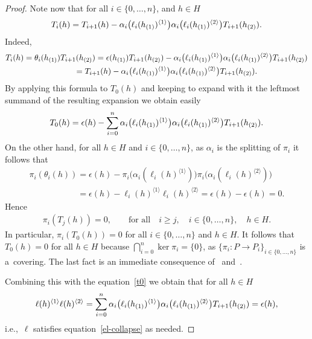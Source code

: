 \documentclass[11pt]{article}
\def\sw#1{{\sb{(#1)}}}
\newcommand{\ls}[1]{\ell(#1)^{\langle 1\rangle}}
\newcommand{\rs}[1]{\ell(#1)^{\langle 2\rangle}}
\newcommand{\lls}[2]{\ell_{#1}(#2)^{\langle 1\rangle}}
\newcommand{\rrs}[2]{\ell_{#1}(#2)^{\langle 2\rangle}}
\begin{document}
\begin{proof}
Note now that for all $i\in\{0,\ldots,n\}$, and $h\in H$
\begin{gather*}
T_i(h)=T_{i+1}(h)-\alpha_i\big(\lls{i}{h\sw{1}}\big)\alpha_i\big(\rrs{i}{h\sw{1}}\big)T_{i+1}(h\sw{2}).
\end{gather*}
Indeed,
\begin{gather*}
T_i(h) =\theta_i(h\sw{1})T_{i+1}(h\sw{2})
 ={\epsilon}(h\sw{1})T_{i+1}(h\sw{2})-\alpha_i\big(\lls{i}{h\sw{1}}\big)\alpha_i\big(\rrs{i}{h\sw{1}}\big)T_{i+1}(h\sw{2})
\\
\phantom{T_i(h)}
 =T_{i+1}(h)-\alpha_i\big(\lls{i}{h\sw{1}}\big)\alpha_i\big(\rrs{i}{h\sw{1}}\big)T_{i+1}(h\sw{2}).
\end{gather*}
By applying this formula to $T_0(h)$ and keeping to expand with it the leftmost summand of the resulting expansion we
obtain easily
\begin{gather}
\label{t0}
T_0(h)={\epsilon}(h)-\sum\limits_{i=0}^n\alpha_i\big(\lls{i}{h\sw{1}}\big)\alpha_i\big(\rrs{i}{h\sw{1}}\big)T_{i+1}(h\sw{2}).
\end{gather}
On the other hand, for all $h\in H$ and $i\in\{0,\ldots,n\}$, as $\alpha_i$ is the splitting of $\pi_i$ it follows that
\begin{gather*}
\pi_i(\theta_i(h))  ={\epsilon}(h)-\pi_i\big(\alpha_i(\lls{i}{h})\big)\pi_i\big(\alpha_i(\rrs{i}{h})\big)
\\
\phantom{\pi_i(\theta_i(h))}
={\epsilon}(h)-\lls{i}{h}\rrs{i}{h} ={\epsilon}(h)-{\epsilon}(h)
 =0.
\end{gather*}
Hence
\begin{gather*}
\pi_i(T_j(h))=0,
\qquad
\text{for all}
\quad
i\geq j,
\quad
i\in\{0,\ldots,n\},
\quad
h\in H.
\end{gather*}
In particular, $\pi_i(T_0(h))=0$ for all $i\in\{0,\ldots,n\}$ and $h\in H$.
It follows that $T_0(h)=0$ for all $h\in H$ because $\bigcap_{i=0}^n\ker\pi_i=\{0\}$, as $\{\pi_i:P\rightarrow
P_i\}_{i\in\{0,\ldots,n\}}$ is a~covering.
The last fact is an immediate consequence of~\cite[Theorem~3.3]{hkmz11} and~\cite[Corollary~3.7]{hkmz11}.

Combining this with the equation~\eqref{t0} we obtain that for all $h\in H$
\begin{gather*}
\ls{h}\rs{h}=\sum\limits_{i=0}^n\alpha_i\big(\lls{i}{h\sw{1}}\big)\alpha_i\big(\rrs{i}{h\sw{1}}\big)T_{i+1}(h\sw{2})={\epsilon}(h),
\end{gather*}
i.e.,~$\ell$ satisf\/ies equation~\eqref{el-collapse} as needed.
\end{proof}
\end{document}
